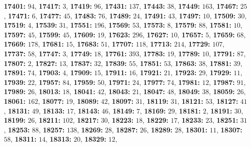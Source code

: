 \textsf{\bfseries 17401:} $94$, \textsf{\bfseries 17417:} $3$, \textsf{\bfseries 17419:} $96$, \textsf{\bfseries 17431:} $137$, \textsf{\bfseries 17443:} $38$, \textsf{\bfseries 17449:} $163$, \textsf{\bfseries 17467:} $25$, \textsf{\bfseries 17471:} $6$, \textsf{\bfseries 17477:} $45$, \textsf{\bfseries 17483:} $76$, \textsf{\bfseries 17489:} $24$, \textsf{\bfseries 17491:} $43$, \textsf{\bfseries 17497:} $10$, \textsf{\bfseries 17509:} $30$, \textsf{\bfseries 17519:} $4$, \textsf{\bfseries 17539:} $31$, \textsf{\bfseries 17551:} $196$, \textsf{\bfseries 17569:} $53$, \textsf{\bfseries 17573:} $8$, \textsf{\bfseries 17579:} $88$, \textsf{\bfseries 17581:} $10$, \textsf{\bfseries 17597:} $45$, \textsf{\bfseries 17599:} $45$, \textsf{\bfseries 17609:} $19$, \textsf{\bfseries 17623:} $296$, \textsf{\bfseries 17627:} $10$, \textsf{\bfseries 17657:} $5$, \textsf{\bfseries 17659:} $68$, \textsf{\bfseries 17669:} $178$, \textsf{\bfseries 17681:} $15$, \textsf{\bfseries 17683:} $51$, \textsf{\bfseries 17707:} $118$, \textsf{\bfseries 17713:} $214$, \textsf{\bfseries 17729:} $107$, \textsf{\bfseries 17737:} $58$, \textsf{\bfseries 17747:} $3$, \textsf{\bfseries 17749:} $18$, \textsf{\bfseries 17761:} $393$, \textsf{\bfseries 17783:} $19$, \textsf{\bfseries 17789:} $10$, \textsf{\bfseries 17791:} $87$, \textsf{\bfseries 17807:} $2$, \textsf{\bfseries 17827:} $13$, \textsf{\bfseries 17837:} $32$, \textsf{\bfseries 17839:} $55$, \textsf{\bfseries 17851:} $53$, \textsf{\bfseries 17863:} $38$, \textsf{\bfseries 17881:} $39$, \textsf{\bfseries 17891:} $74$, \textsf{\bfseries 17903:} $4$, \textsf{\bfseries 17909:} $15$, \textsf{\bfseries 17911:} $16$, \textsf{\bfseries 17921:} $21$, \textsf{\bfseries 17923:} $29$, \textsf{\bfseries 17929:} $11$, \textsf{\bfseries 17939:} $22$, \textsf{\bfseries 17957:} $84$, \textsf{\bfseries 17959:} $50$, \textsf{\bfseries 17971:} $24$, \textsf{\bfseries 17977:} $74$, \textsf{\bfseries 17981:} $12$, \textsf{\bfseries 17987:} $91$, \textsf{\bfseries 17989:} $26$, \textsf{\bfseries 18013:} $18$, \textsf{\bfseries 18041:} $42$, \textsf{\bfseries 18043:} $21$, \textsf{\bfseries 18047:} $48$, \textsf{\bfseries 18049:} $38$, \textsf{\bfseries 18059:} $26$, \textsf{\bfseries 18061:} $162$, \textsf{\bfseries 18077:} $19$, \textsf{\bfseries 18089:} $42$, \textsf{\bfseries 18097:} $31$, \textsf{\bfseries 18119:} $31$, \textsf{\bfseries 18121:} $53$, \textsf{\bfseries 18127:} $41$, \textsf{\bfseries 18131:} $49$, \textsf{\bfseries 18133:} $17$, \textsf{\bfseries 18143:} $46$, \textsf{\bfseries 18149:} $7$, \textsf{\bfseries 18169:} $29$, \textsf{\bfseries 18181:} $2$, \textsf{\bfseries 18191:} $30$, \textsf{\bfseries 18199:} $26$, \textsf{\bfseries 18211:} $102$, \textsf{\bfseries 18217:} $30$, \textsf{\bfseries 18223:} $18$, \textsf{\bfseries 18229:} $17$, \textsf{\bfseries 18233:} $23$, \textsf{\bfseries 18251:} $31$, \textsf{\bfseries 18253:} $88$, \textsf{\bfseries 18257:} $138$, \textsf{\bfseries 18269:} $28$, \textsf{\bfseries 18287:} $26$, \textsf{\bfseries 18289:} $28$, \textsf{\bfseries 18301:} $11$, \textsf{\bfseries 18307:} $58$, \textsf{\bfseries 18311:} $14$, \textsf{\bfseries 18313:} $20$, \textsf{\bfseries 18329:} $12$, 
